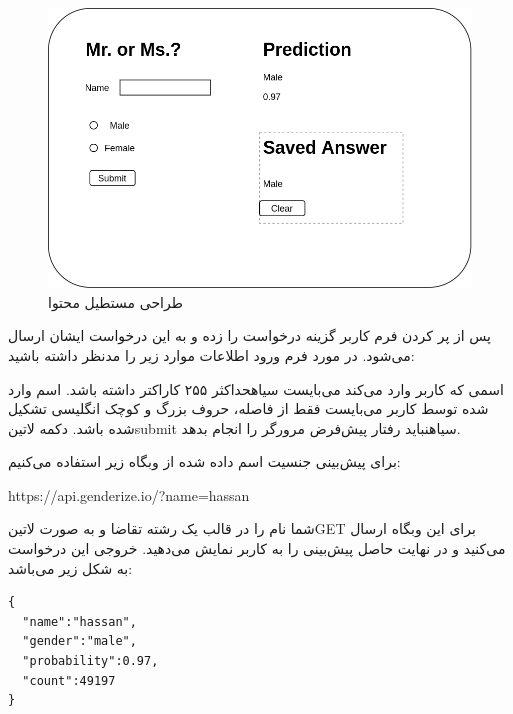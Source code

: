 \documentclass[../main.tex]{subfiles}
\begin{document}
\begin{figure}[h]
  \centering
  \includegraphics[scale=0.3]{./genderize-content}
  \caption{طراحی مستطیل محتوا}
\end{figure}

پس از پر کردن فرم کاربر گزینه درخواست را زده و به این درخواست ایشان ارسال می‌شود. در مورد فرم ورود اطلاعات موارد زیر را مدنظر داشته باشید:

 اسمی که کاربر وارد می‌کند می‌بایست ‌سیاه{حداکثر} ۲۵۵ کاراکتر داشته باشد.
 اسم وارد شده توسط کاربر می‌بایست فقط از فاصله، حروف بزرگ و کوچک انگلیسی تشکیل شده باشد.
 دکمه ‌لاتین{submit} ‌سیاه{نباید} رفتار پیش‌فرض مرورگر را انجام بدهد.

برای پیش‌بینی جنسیت اسم داده شده از وبگاه زیر استفاده می‌کنیم:

\begin{latin}\begin{center}
https://api.genderize.io/?name=hassan
\end{center}\end{latin}

شما نام را در قالب یک رشته تقاضا و به صورت ‌لاتین{GET} برای این وبگاه ارسال می‌کنید و در نهایت حاصل پیش‌بینی را به کاربر نمایش می‌دهید. خروجی این درخواست به شکل زیر می‌باشد:

\begin{latin}
\begin{verbatim}
{
  "name":"hassan",
  "gender":"male",
  "probability":0.97,
  "count":49197
}
\end{verbatim}
\end{latin}
\end{document}
